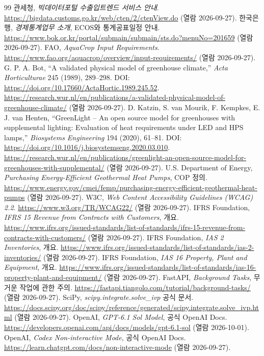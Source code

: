 \documentclass[11pt,a4paper]{article}
\begin{document}
\begin{thebibliography}{99}
 관세청, \emph{빅데이터포털 수출입트렌드 서비스 안내}. \url{https://bigdata.customs.go.kr/web/cten/2/ctenView.do} (열람 2026-09-27).
 한국은행, \emph{경제통계업무 소개}, ECOS와 통계공표일정 안내. \url{https://www.bok.or.kr/portal/submain/submain/sts.do?menuNo=201659} (열람 2026-09-27).
 FAO, \emph{AquaCrop Input Requirements}. \url{https://www.fao.org/aquacrop/overview/input-requirements/} (열람 2026-09-27).
 G. P. A. Bot, ``A validated physical model of greenhouse climate,'' \emph{Acta Horticulturae} 245 (1989), 289--298. DOI: \url{https://doi.org/10.17660/ActaHortic.1989.245.52}. \url{https://research.wur.nl/en/publications/a-validated-physical-model-of-greenhouse-climate/} (열람 2026-09-27).
 D. Katzin, S. van Mourik, F. Kempkes, E. J. van Henten, ``GreenLight -- An open source model for greenhouses with supplemental lighting: Evaluation of heat requirements under LED and HPS lamps,'' \emph{Biosystems Engineering} 194 (2020), 61--81. DOI: \url{https://doi.org/10.1016/j.biosystemseng.2020.03.010}. \url{https://research.wur.nl/en/publications/greenlight-an-open-source-model-for-greenhouses-with-supplemental/} (열람 2026-09-27).
 U.S. Department of Energy, \emph{Purchasing Energy-Efficient Geothermal Heat Pumps}, COP 정의. \url{https://www.energy.gov/cmei/femp/purchasing-energy-efficient-geothermal-heat-pumps} (열람 2026-09-27).
 W3C, \emph{Web Content Accessibility Guidelines (WCAG) 2.2}. \url{https://www.w3.org/TR/WCAG22/} (열람 2026-09-27).
 IFRS Foundation, \emph{IFRS 15 Revenue from Contracts with Customers}, 개요. \url{https://www.ifrs.org/issued-standards/list-of-standards/ifrs-15-revenue-from-contracts-with-customers/} (열람 2026-09-27).
 IFRS Foundation, \emph{IAS 2 Inventories}, 개요. \url{https://www.ifrs.org/issued-standards/list-of-standards/ias-2-inventories/} (열람 2026-09-27).
 IFRS Foundation, \emph{IAS 16 Property, Plant and Equipment}, 개요. \url{https://www.ifrs.org/issued-standards/list-of-standards/ias-16-property-plant-and-equipment/} (열람 2026-09-27).
 FastAPI, \emph{Background Tasks}, 무거운 작업에 관한 주의. \url{https://fastapi.tiangolo.com/tutorial/background-tasks/} (열람 2026-09-27).
 SciPy, \emph{scipy.integrate.solve\_ivp} 공식 문서. \url{https://docs.scipy.org/doc/scipy/reference/generated/scipy.integrate.solve_ivp.html} (열람 2026-09-27).
 OpenAI, \emph{GPT-6.1 Sol Model}, 공식 OpenAI Docs. \url{https://developers.openai.com/api/docs/models/gpt-6.1-sol} (열람 2026-10-01).
 OpenAI, \emph{Codex Non-interactive Mode}, 공식 OpenAI Docs. \url{https://learn.chatgpt.com/docs/non-interactive-mode} (열람 2026-09-27).
\end{thebibliography}
\end{document}
